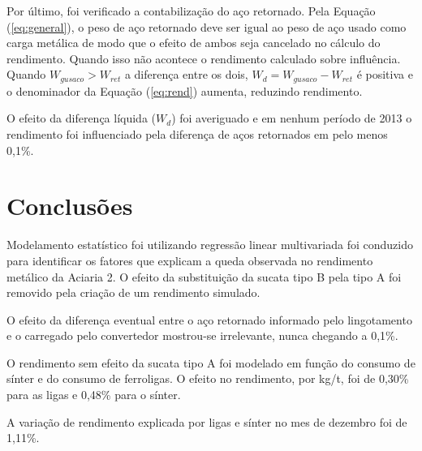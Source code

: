 \begin{multicols}{2}
	Por último, foi verificado a contabilização do aço retornado. Pela Equação (\ref{eq:general}), o peso de aço retornado deve ser igual ao peso de aço usado como carga metálica de modo que o efeito de ambos seja cancelado no cálculo do rendimento. Quando isso não acontece o rendimento calculado sobre influência. Quando $W_{gusaco} > W_{ret}$ a diferença entre os dois, $W_{d} = W_{gusaco}-W_{ret}$ é positiva e o denominador da Equação (\ref{eq:rend}) aumenta, reduzindo rendimento. 
	
	O efeito da diferença líquida ($W_{d}$) foi averiguado e em nenhum período de 2013 o rendimento foi influenciado pela diferença de aços retornados em pelo menos 0,1\%.
\section{Conclusões}
	Modelamento estatístico foi utilizando regressão linear multivariada foi conduzido para identificar os fatores que explicam a queda observada no rendimento metálico da Aciaria 2. O efeito da substituição da sucata tipo B pela tipo A foi removido pela criação de um rendimento simulado. 
	
	O efeito da diferença eventual entre o aço retornado informado pelo lingotamento e o carregado pelo convertedor mostrou-se irrelevante, nunca chegando a 0,1\%.
	
	O rendimento sem efeito da sucata tipo A foi modelado em função do consumo de sínter e do consumo de ferroligas. O efeito no rendimento, por kg/t, foi de 0,30\% para as ligas e 0,48\% para o sínter.
	
	A variação de rendimento explicada por ligas e sínter no mes de dezembro foi de 1,11\%.

% 
% 
\renewcommand{\bibname}{Referências}


\end{multicols}	